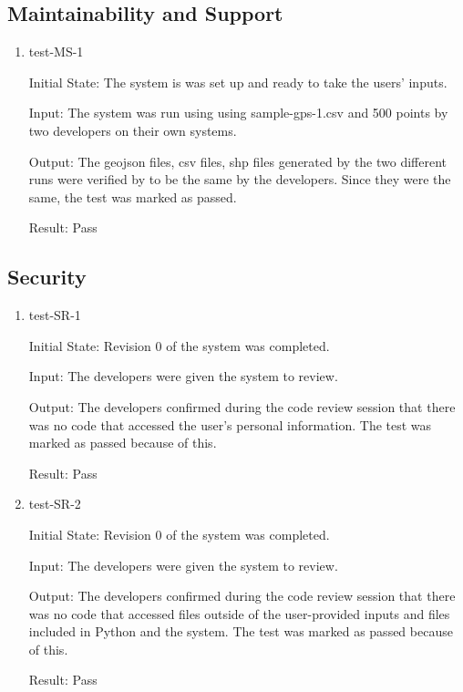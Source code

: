 \documentclass[12pt, titlepage]{article}
\begin{document}
\subsection{Maintainability and Support}

\begin{enumerate}

\item{test-MS-1} \label{test-MS-1}

Initial State: The system is was set up and ready to take the users' inputs.

Input: The system was run using using sample-gps-1.csv and 500 points by two developers on their own systems.

Output: The geojson files, csv files, shp files generated by the two different runs were verified by to be the same by the developers. Since they were the same, the test was marked as passed.

Result: Pass

\end{enumerate}

\subsection{Security}

\begin{enumerate}
    \item{test-SR-1} \label{test-SR-1}
    
    Initial State: Revision 0 of the system was completed.

    Input: The developers were given the system to review.
    
    Output: The developers confirmed during the code review session that there was no code that accessed the user's personal information. The test was marked as passed because of this.
    
    Result: Pass

    \item{test-SR-2} \label{test-SR-2}
    
    Initial State: Revision 0 of the system was completed.

    Input: The developers were given the system to review.
    
    Output: The developers confirmed during the code review session that there was no code that accessed files outside of the user-provided inputs and files included in Python and the system. The test was marked as passed because of this.
    
    Result: Pass
\end{enumerate}
\end{document}
